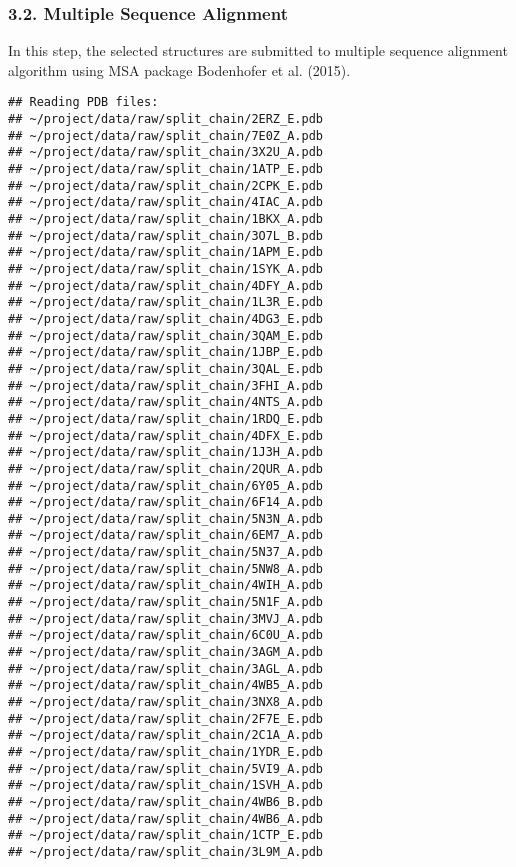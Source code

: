 \documentclass[
]{article}
\begin{document}
\hypertarget{multiple-sequence-alignment}{%
\subsubsection{3.2. Multiple Sequence
Alignment}\label{multiple-sequence-alignment}}

In this step, the selected structures are submitted to multiple sequence
alignment algorithm using MSA package Bodenhofer et al. (2015).

\begin{verbatim}
## Reading PDB files:
## ~/project/data/raw/split_chain/2ERZ_E.pdb
## ~/project/data/raw/split_chain/7E0Z_A.pdb
## ~/project/data/raw/split_chain/3X2U_A.pdb
## ~/project/data/raw/split_chain/1ATP_E.pdb
## ~/project/data/raw/split_chain/2CPK_E.pdb
## ~/project/data/raw/split_chain/4IAC_A.pdb
## ~/project/data/raw/split_chain/1BKX_A.pdb
## ~/project/data/raw/split_chain/3O7L_B.pdb
## ~/project/data/raw/split_chain/1APM_E.pdb
## ~/project/data/raw/split_chain/1SYK_A.pdb
## ~/project/data/raw/split_chain/4DFY_A.pdb
## ~/project/data/raw/split_chain/1L3R_E.pdb
## ~/project/data/raw/split_chain/4DG3_E.pdb
## ~/project/data/raw/split_chain/3QAM_E.pdb
## ~/project/data/raw/split_chain/1JBP_E.pdb
## ~/project/data/raw/split_chain/3QAL_E.pdb
## ~/project/data/raw/split_chain/3FHI_A.pdb
## ~/project/data/raw/split_chain/4NTS_A.pdb
## ~/project/data/raw/split_chain/1RDQ_E.pdb
## ~/project/data/raw/split_chain/4DFX_E.pdb
## ~/project/data/raw/split_chain/1J3H_A.pdb
## ~/project/data/raw/split_chain/2QUR_A.pdb
## ~/project/data/raw/split_chain/6Y05_A.pdb
## ~/project/data/raw/split_chain/6F14_A.pdb
## ~/project/data/raw/split_chain/5N3N_A.pdb
## ~/project/data/raw/split_chain/6EM7_A.pdb
## ~/project/data/raw/split_chain/5N37_A.pdb
## ~/project/data/raw/split_chain/5NW8_A.pdb
## ~/project/data/raw/split_chain/4WIH_A.pdb
## ~/project/data/raw/split_chain/5N1F_A.pdb
## ~/project/data/raw/split_chain/3MVJ_A.pdb
## ~/project/data/raw/split_chain/6C0U_A.pdb
## ~/project/data/raw/split_chain/3AGM_A.pdb
## ~/project/data/raw/split_chain/3AGL_A.pdb
## ~/project/data/raw/split_chain/4WB5_A.pdb
## ~/project/data/raw/split_chain/3NX8_A.pdb
## ~/project/data/raw/split_chain/2F7E_E.pdb
## ~/project/data/raw/split_chain/2C1A_A.pdb
## ~/project/data/raw/split_chain/1YDR_E.pdb
## ~/project/data/raw/split_chain/5VI9_A.pdb
## ~/project/data/raw/split_chain/1SVH_A.pdb
## ~/project/data/raw/split_chain/4WB6_B.pdb
## ~/project/data/raw/split_chain/4WB6_A.pdb
## ~/project/data/raw/split_chain/1CTP_E.pdb
## ~/project/data/raw/split_chain/3L9M_A.pdb

\end{verbatim}
\end{document}
